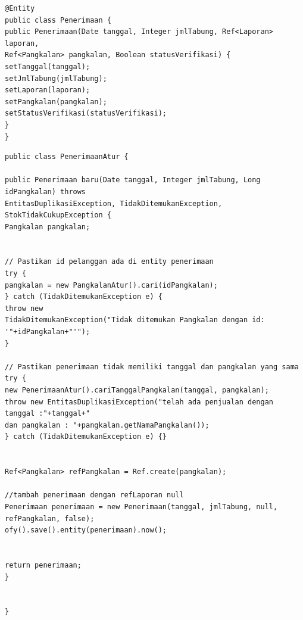 
\begin{lstlisting}[caption=Potongan kode \textit{model} basis data layanan web, label=modelWebservice]
@Entity
public class Penerimaan {
public Penerimaan(Date tanggal, Integer jmlTabung, Ref<Laporan> laporan, 
Ref<Pangkalan> pangkalan, Boolean statusVerifikasi) {
setTanggal(tanggal);
setJmlTabung(jmlTabung);
setLaporan(laporan);
setPangkalan(pangkalan);
setStatusVerifikasi(statusVerifikasi);
}
}

\end{lstlisting}	


\begin{lstlisting}[caption=Potongan kode \textit{controller} layanan web, label=controllerWebservice]
public class PenerimaanAtur {

public Penerimaan baru(Date tanggal, Integer jmlTabung, Long idPangkalan) throws 
EntitasDuplikasiException, TidakDitemukanException, StokTidakCukupException {
Pangkalan pangkalan;


// Pastikan id pelanggan ada di entity penerimaan
try {
pangkalan = new PangkalanAtur().cari(idPangkalan);
} catch (TidakDitemukanException e) {
throw new 
TidakDitemukanException("Tidak ditemukan Pangkalan dengan id: '"+idPangkalan+"'");
}

// Pastikan penerimaan tidak memiliki tanggal dan pangkalan yang sama
try {
new PenerimaanAtur().cariTanggalPangkalan(tanggal, pangkalan);
throw new EntitasDuplikasiException("telah ada penjualan dengan tanggal :"+tanggal+"
dan pangkalan : "+pangkalan.getNamaPangkalan());
} catch (TidakDitemukanException e) {}


Ref<Pangkalan> refPangkalan = Ref.create(pangkalan);

//tambah penerimaan dengan refLaporan null
Penerimaan penerimaan = new Penerimaan(tanggal, jmlTabung, null, refPangkalan, false);
ofy().save().entity(penerimaan).now();


return penerimaan;
}


}

\end{lstlisting}

